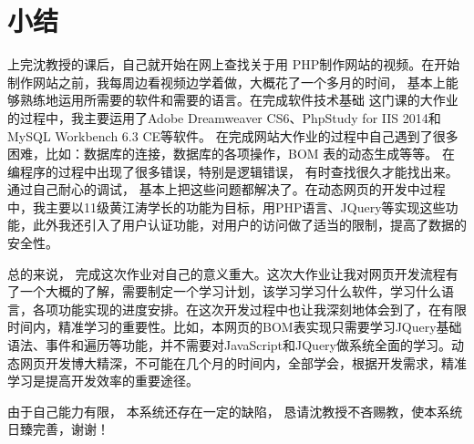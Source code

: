 \section*{小结}
上完沈教授的课后，自己就开始在网上查找关于用 PHP制作网站的视频。在开始制作网站之前，我每周边看视频边学着做，大概花了一个多月的时间， 基本上能够熟练地运用所需要的软件和需要的语言。在完成软件技术基础
这门课的大作业的过程中，我主要运用了Adobe Dreamweaver CS6、PhpStudy for IIS 2014和MySQL Workbench 6.3 CE等软件。
在完成网站大作业的过程中自己遇到了很多困难，比如：数据库的连接，数据库的各项操作，BOM 表的动态生成等等。 在编程序的过程中出现了很多错误，特别是逻辑错误， 有时查找很久才能找出来。 通过自己耐心的调试， 基本上把这些问题都解决了。在动态网页的开发中过程中，我主要以11级黄江涛学长的功能为目标，用PHP语言、JQuery等实现这些功能，此外我还引入了用户认证功能，对用户的访问做了适当的限制，提高了数据的安全性。

总的来说， 完成这次作业对自己的意义重大。这次大作业让我对网页开发流程有了一个大概的了解，需要制定一个学习计划，该学习学习什么软件，学习什么语言，各项功能实现的进度安排。在这次开发过程中也让我深刻地体会到了，在有限时间内，精准学习的重要性。比如，本网页的BOM表实现只需要学习JQuery基础语法、事件和遍历等功能，并不需要对JavaScript和JQuery做系统全面的学习。动态网页开发博大精深，不可能在几个月的时间内，全部学会，根据开发需求，精准学习是提高开发效率的重要途径。

由于自己能力有限， 本系统还存在一定的缺陷， 恳请沈教授不吝赐教，使本系统日臻完善，谢谢！